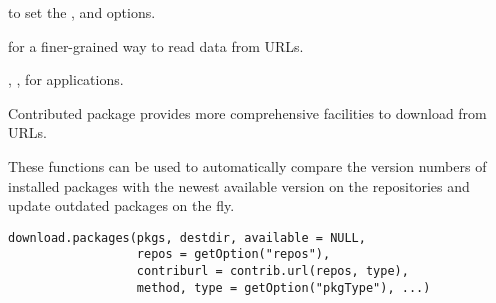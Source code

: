 %
\begin{SeeAlso}\relax
{} to set the , 
and  options.

 for a finer-grained way to read data from URLs.

, ,
 for applications.

Contributed package  provides more comprehensive
facilities to download from URLs.
\end{SeeAlso}
%
\begin{Description}\relax
These functions can be used to automatically compare the version
numbers of installed packages with the newest available version on
the repositories and update outdated packages on the fly.
\end{Description}
%
\begin{Usage}
\begin{verbatim}
download.packages(pkgs, destdir, available = NULL,
                  repos = getOption("repos"),
                  contriburl = contrib.url(repos, type),
                  method, type = getOption("pkgType"), ...)
\end{verbatim}
\end{Usage}
%

